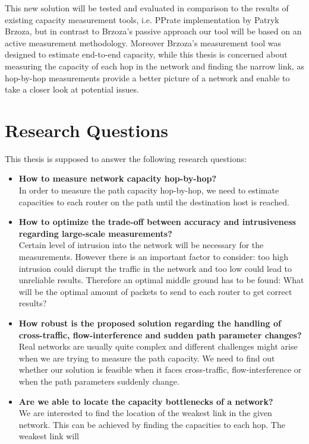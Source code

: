 This new solution will be tested and evaluated in comparison to the results of existing capacity measurement tools, i.e. PPrate implementation by Patryk Brzoza\cite{brzoza}, but in contrast to Brzoza’s passive approach our tool will be based on an active measurement methodology. Moreover Brzoza’s measurement tool was designed to estimate end-to-end capacity, while this thesis is concerned about measuring the capacity of each hop in the network and finding the narrow link, as hop-by-hop measurements provide a better picture of a network and enable to take a closer look at potential issues.



\section{Research Questions}
This thesis is supposed to answer the following research questions:

\begin{itemize}
  \item \textbf{How to measure network capacity hop-by-hop?}
  \\In order to measure the path capacity hop-by-hop, we need to estimate capacities to each router on the path until the destination host is reached. 
  \item \textbf{How to optimize the trade-off between accuracy and intrusiveness regarding large-scale measurements?}
  \\Certain level of intrusion into the network will be necessary for the measurements. However there is an important factor to consider: too high intrusion could disrupt the traffic in the network and too low could lead to unreliable results. Therefore an optimal middle ground has to be found: What will be the optimal amount of packets to send to each router to get correct results?
  \item \textbf{How robust is the proposed solution regarding the handling of cross-traffic, flow-interference and sudden path parameter changes?}
  \\Real networks are usually quite complex and different challenges might arise when we are trying to measure the path capacity. We need to find out whether our solution is feasible when it faces cross-traffic, flow-interference or when the path parameters suddenly change.
  \item \textbf{Are we able to locate the capacity bottlenecks of a network?}
  \\ We are interested to find the location of the weakest link in the given network. This can be achieved by finding the capacities to each hop. The weakest link will 
\end{itemize}

